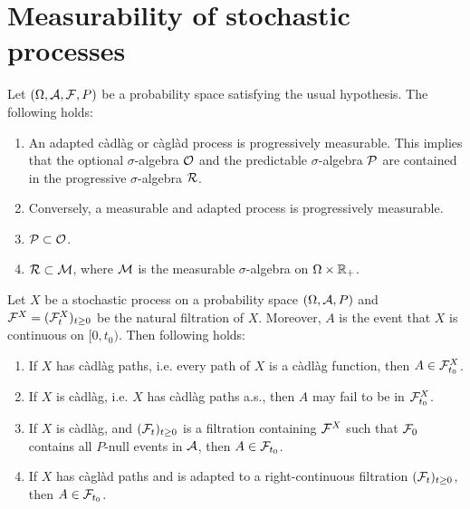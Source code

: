 
\section{Measurability of stochastic processes}

Let $(\Omega, \mathcal A, \mathcal F, P)$ be a probability space satisfying the usual hypothesis. 
The following holds: 
\begin{enumerate}
    \item An adapted c\`adl\`ag or c\`agl\`ad process is progressively
        measurable. This implies that the optional $\sigma$-algebra $\mathcal O$ and 
        the predictable $\sigma$-algebra $\mathcal P$ are contained in the 
        progressive $\sigma$-algebra $\mathcal R$. 

    \item Conversely, a measurable and adapted process is progressively
        measurable.

    \item $\mathcal P \subset \mathcal O$. 

    \item $\mathcal R \subset\mathcal M$, where $\mathcal M$ is the measurable $\sigma$-algebra on
        $\Omega\times \mathbb{R}_{+}$. 
\end{enumerate}

 Let $X$ be a stochastic process
on a probability space $(\Omega, \mathcal A, P)$ and $\mathcal F^{X}=(\mathcal F^{X}_{t})_{t\geq 0}$
be the natural filtration of $X$. Moreover, $A$ is the event that $X$ is
continuous on $[0, t_0)$. Then following holds:
\begin{enumerate}
    \item If $X$ has c\`adl\`ag paths, i.e. every path of $X$ is a c\`adl\`ag
        function, then $A\in \mathcal F^{X}_{t_0}$. 

    \item If $X$ is c\`adl\`ag, i.e. $X$ has c\`adl\`ag paths a.s., then $A$
        may fail to be in $\mathcal F^{X}_{t_0}$.

    \item If $X$ is c\`adl\`ag, and $(\mathcal F_{t})_{t\geq 0}$ is a filtration
        containing $\mathcal F^{X}$ such that $\mathcal F_{0}$ contains all $P$-null events
        in $\mathcal A$, then $A\in \mathcal F_{t_0}$.

    \item If $X$ has c\`agl\`ad paths and is adapted to a right-continuous
        filtration $(\mathcal F_{t})_{t\geq 0}$, then $A\in \mathcal F_{t_{0}}$. 
\end{enumerate}


